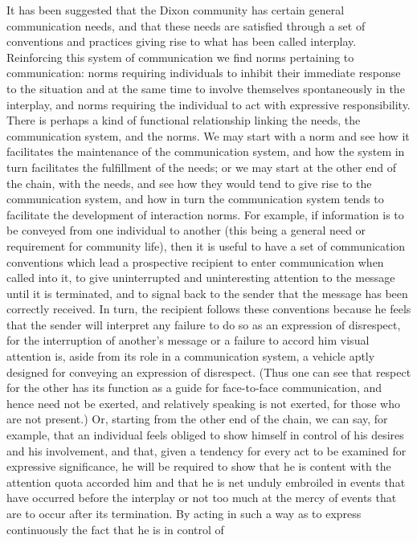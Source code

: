 \documentclass[twoside,symmetric,nobib,justified]{tufte-book}
\begin{document}
It has been suggested that the Dixon community has certain general
communication needs, and that these needs are satisfied through a set of
conventions and practices giving rise to what has been called interplay.
Reinforcing this system of communication we find norms pertaining to
communication: norms requiring individuals to inhibit their immediate
response to the situation and at the same time to involve themselves
spontaneously in the interplay, and norms requiring the individual to
act with expressive responsibility. There is perhaps a kind of
functional relationship linking the needs, the communication system, and
the norms. We may start with a norm and see how it facilitates the
maintenance of the communication system, and how the system in turn
facilitates the fulfillment of the needs; or we may start at the other
end of the chain, with the needs, and see how they would tend to give
rise to the communication system, and how in turn the communication
system tends to facilitate the development of interaction norms. For
example, if information is to be conveyed from one individual to another
(this being a general need or requirement for community life), then it
is useful to have a set of communication conventions which lead a
prospective recipient to enter communication when called into it, to
give uninterrupted and uninteresting attention to the message until it
is terminated, and to signal back to the sender that the message has
been correctly received. In turn, the recipient follows these
conventions because he feels that the sender will interpret any failure
to do so as an expression of disrespect, for the interruption of
another's message or a failure to accord him visual attention is, aside
from its role in a communication system, a vehicle aptly designed for
conveying an expression of disrespect. (Thus one can see that respect
for the other has its function as a guide for face-to-face
communication, and hence need not be exerted, and relatively speaking is
not exerted, for those who are not present.) Or, starting from the other
end of the chain, we can say, for example, that an individual feels
obliged to show himself in control of his desires and his involvement,
and that, given a tendency for every act to be examined for expressive
significance, he will be required to show that he is content with the
attention quota accorded him and that he is net unduly embroiled in
events that have occurred before the interplay or not too much at the
mercy of events that are to occur after its termination. By acting in
such a way as to express continuously the fact that he is in control of
\end{document}
